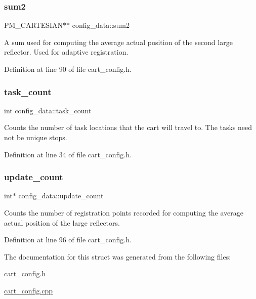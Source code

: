\subsubsection{\texorpdfstring{sum2}{sum2}}
{\footnotesize\ttfamily P\+M\+\_\+\+C\+A\+R\+T\+E\+S\+I\+AN$\ast$$\ast$ config\+\_\+data\+::sum2}

A sum used for computing the average actual position of the second large reflector. Used for adaptive registration. 

Definition at line 90 of file cart\+\_\+config.\+h.

\mbox{\label{structconfig__data_a59732367f47b44028e541b861b07e319}} 
\subsubsection{\texorpdfstring{task\+\_\+count}{task\_count}}
{\footnotesize\ttfamily int config\+\_\+data\+::task\+\_\+count}

Counts the number of task locations that the cart will travel to. The tasks need not be unique stops. 

Definition at line 34 of file cart\+\_\+config.\+h.

\mbox{\label{structconfig__data_a6ace513dc3e25bf68ceb558cb0c47396}} 
\subsubsection{\texorpdfstring{update\+\_\+count}{update\_count}}
{\footnotesize\ttfamily int$\ast$ config\+\_\+data\+::update\+\_\+count}

Counts the number of registration points recorded for computing the average actual position of the large reflectors. 

Definition at line 96 of file cart\+\_\+config.\+h.



The documentation for this struct was generated from the following files\+:\begin{DoxyCompactItemize}
\item 
\mbox{\hyperlink{cart__config_8h}{cart\+\_\+config.\+h}}\item 
\mbox{\hyperlink{cart__config_8cpp}{cart\+\_\+config.\+cpp}}\end{DoxyCompactItemize}
